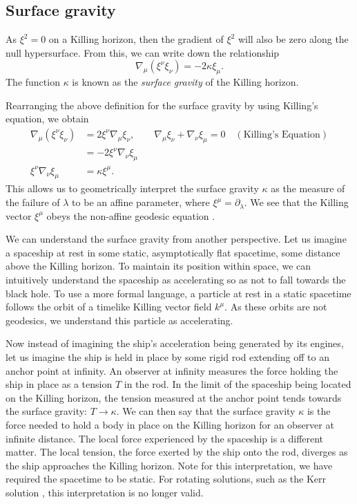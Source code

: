 \subsection{Surface gravity}

As $\xi^2 = 0$ on a Killing horizon, then the gradient of $\xi^2$ will also be zero along the null hypersurface. From this, we can write down the relationship \cite{Poisson:2009pwt}
\begin{equation}
\label{eq:surfacegravity}
	\nabla_\mu (\xi^\nu \xi_\nu) = -2 \kappa \xi_\mu.
\end{equation}
The function $\kappa$ is known as the \emph{surface gravity} of the Killing horizon.

Rearranging the above definition for the surface gravity by using Killing's equation, we obtain
\begin{equation*}
\begin{aligned}
		\nabla_\mu (\xi^\nu \xi_\nu) &= 2 \xi^\nu \nabla_\mu \xi_\nu, \qquad \nabla_\mu \xi_\nu + \nabla_\nu \xi_\mu = 0 \quad (\text{Killing's Equation}) \\
		&= -2 \xi^\nu \nabla_\nu \xi_\mu \\
		\xi^\nu \nabla_\nu \xi_\mu &= \kappa \xi^\mu.
\end{aligned}	
\end{equation*}
This allows us to geometrically interpret the surface gravity $\kappa$ as the measure of the failure of $\lambda$ to be an affine parameter, where $\xi^\mu = \partial_\lambda$. We see that the Killing vector $\xi^\mu$ obeys the non-affine geodesic equation .

We can understand the surface gravity from another perspective. Let us imagine a spaceship at rest in some static, asymptotically flat spacetime, some distance above the Killing horizon. To maintain its position within space, we can intuitively understand the spaceship as accelerating so as not to fall towards the black hole. To use a more formal language, a particle at rest in a static spacetime follows the orbit of a timelike Killing vector field $k^\mu$. As these orbits are not geodesics, we understand this particle as accelerating. 

Now instead of imagining the ship's acceleration being generated by its engines, let us imagine the ship is held in place by some rigid rod extending off to an anchor point at infinity. An observer at infinity measures the force holding the ship in place as a tension $T$ in the rod. In the limit of the spaceship being located on the Killing horizon, the tension measured at the anchor point tends towards the surface gravity: $T \to \kappa$. We can then say that the surface gravity $\kappa$ is the force needed to hold a body in place on the Killing horizon for an observer at infinite distance. The local force experienced by the spaceship is a different matter. The local tension, \ie the force exerted by the ship onto the rod, diverges as the ship approaches the Killing horizon. Note for this interpretation, we have required the spacetime to be static. For rotating solutions, such as the Kerr solution \cite{Kerr:1963ud}, this interpretation is no longer valid.


